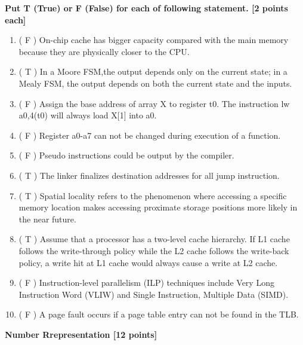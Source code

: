 \documentclass[addpoints, 12pt, answers]{exam}
\begin{document}
\begin{questions}

\question[20] \textbf{Put T (True) or F (False) for each of following statement. [2 points each]}

\begin{enumerate}[(1)]
    \item ( F ) On-chip cache has bigger capacity compared with the main memory because they are physically closer to the CPU.

    \item ( T ) In a Moore FSM,the output depends only on the current state; in a Mealy FSM, the output depends on both the current state and the inputs.
    
    \item ( F ) Assign the base address of array X to register t0. The instruction lw a0,4(t0) will always load X[1] into a0.

    \item ( F ) Register a0-a7 can not be changed during execution of a function.

    \item ( F ) Pseudo instructions could be output by the compiler.

    \item ( T ) The linker finalizes destination addresses for all jump instruction.

    \item ( T ) Spatial locality refers to the phenomenon where accessing a specific memory location makes accessing proximate storage positions more likely in the near future.

    \item ( T ) Assume that a processor has a two-level cache hierarchy. If L1 cache follows the write-through policy while the L2 cache follows the write-back policy, a write hit at L1 cache would always cause a write at L2 cache. 

    \item ( F ) Instruction-level parallelism (ILP) techniques include Very Long Instruction Word (VLIW) and Single Instruction, Multiple Data (SIMD).

    \item ( F ) A page fault occurs if a page table entry can not be found in the TLB.
    
\end{enumerate}

\pagebreak

\question \textbf{Number Rrepresentation [12 points]}
\begin{parts}


\end{parts}
\end{questions}
\end{document}
